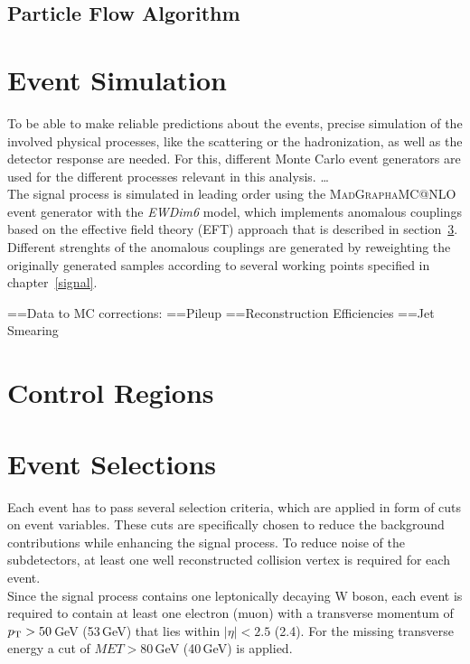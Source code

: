 \subsection{Particle Flow Algorithm}
\section{Event Simulation}
\label{sec:MC}
To be able to make reliable predictions about the events, precise simulation of the involved physical processes, like the scattering or the hadronization, as well as the detector response are needed. For this, different Monte Carlo event generators are used for the different processes relevant in this analysis.
\dots \\
The signal process is simulated in leading order using the \textsc{MadGraph\textunderscore aMC@NLO} event generator with the \textit{EWDim6} model\cite{madgraph}, which implements anomalous couplings based on the effective field theory (EFT) approach that is described in section~\ref{}. Different strenghts of the anomalous couplings are generated by reweighting the originally generated samples according to several working points specified in chapter~\ref{signal}.


=={Data to MC corrections:}
=={Pileup}
=={Reconstruction Efficiencies}
=={Jet Smearing}
\section{Control Regions}
\section{Event Selections}
Each event has to pass several selection criteria, which are applied in form of cuts on event variables. These cuts are specifically chosen to reduce the background contributions while enhancing the signal process. To reduce noise of the subdetectors, at least one well reconstructed collision vertex is required for each event.\\

\noindent Since the signal process contains one leptonically decaying W boson, each event is required to contain at least one electron (muon) with a transverse momentum of $p_{\rm T}>50$\,GeV (53\,GeV) that lies within $|\eta|<2.5$ (2.4). For the missing transverse energy a cut of $MET>80$\,GeV (40\,GeV) is applied. 